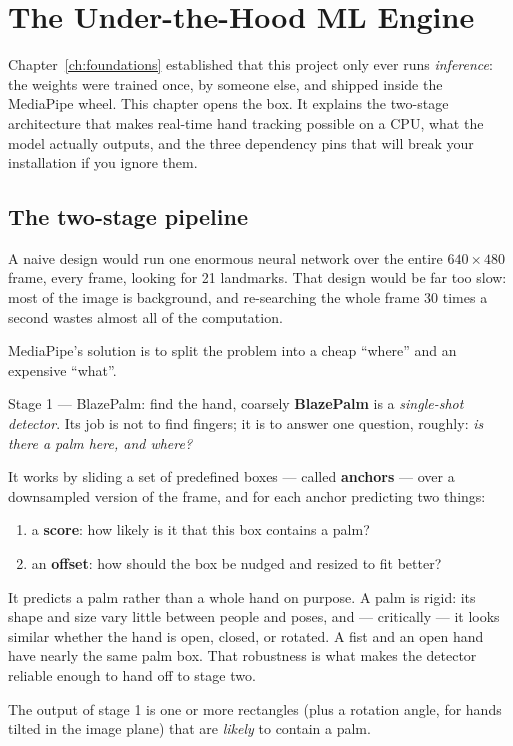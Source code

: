 \chapter{The Under-the-Hood ML Engine}
\label{ch:engine}

Chapter~\ref{ch:foundations} established that this project only ever runs \emph{inference}: the
weights were trained once, by someone else, and shipped inside the MediaPipe wheel. This chapter
opens the box. It explains the two-stage architecture that makes real-time hand tracking possible on
a CPU, what the model actually outputs, and the three dependency pins that will break your
installation if you ignore them.

\section{The two-stage pipeline}

A naive design would run one enormous neural network over the entire $640 \times 480$ frame, every
frame, looking for 21 landmarks. That design would be far too slow: most of the image is background,
and re-searching the whole frame 30 times a second wastes almost all of the computation.

MediaPipe's solution is to split the problem into a cheap ``where'' and an expensive ``what''.

\begin{mlconcept}{Stage 1 --- BlazePalm: find the hand, coarsely}
\textbf{BlazePalm} is a \emph{single-shot detector}. Its job is not to find fingers; it is to answer
one question, roughly: \emph{is there a palm here, and where?}

It works by sliding a set of predefined boxes --- called \textbf{anchors} --- over a downsampled
version of the frame, and for each anchor predicting two things:

\begin{enumerate}
  \item a \textbf{score}: how likely is it that this box contains a palm?
  \item an \textbf{offset}: how should the box be nudged and resized to fit better?
\end{enumerate}

It predicts a palm rather than a whole hand on purpose. A palm is rigid: its shape and size vary
little between people and poses, and --- critically --- it looks similar whether the hand is open,
closed, or rotated. A fist and an open hand have nearly the same palm box. That robustness is what
makes the detector reliable enough to hand off to stage two.

The output of stage 1 is one or more rectangles (plus a rotation angle, for hands tilted in the
image plane) that are \emph{likely} to contain a palm.
\end{mlconcept}


